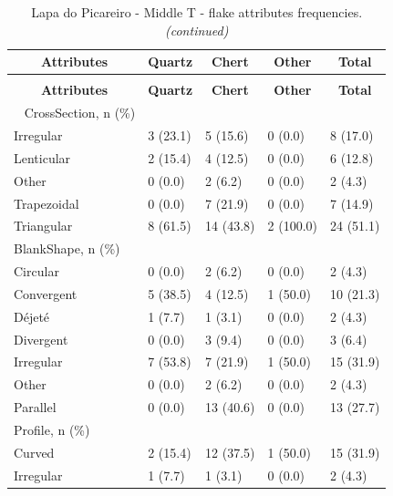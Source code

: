 \documentclass[12pt,twoside]{reedthesis}
\begin{document}
\newpage

\begingroup\fontsize{9}{11}\selectfont
\begin{longtable}[t]{lllll}
\caption{\label{tab:flakeattributesLP2}Lapa do Picareiro - Middle T - flake attributes frequencies.}\\
\toprule
\multicolumn{1}{c}{\textbf{Attributes}} & \multicolumn{1}{c}{\textbf{Quartz}} & \multicolumn{1}{c}{\textbf{Chert}} & \multicolumn{1}{c}{\textbf{Other}} & \multicolumn{1}{c}{\textbf{Total}}\\
\midrule
\endfirsthead
\caption[]{\label{tab:flakeattributesLP2}Lapa do Picareiro - Middle T - flake attributes frequencies. \textit{(continued)}}\\
\toprule
\multicolumn{1}{c}{\textbf{Attributes}} & \multicolumn{1}{c}{\textbf{Quartz}} & \multicolumn{1}{c}{\textbf{Chert}} & \multicolumn{1}{c}{\textbf{Other}} & \multicolumn{1}{c}{\textbf{Total}}\\
\midrule
\endhead
\
\endfoot
\bottomrule
\endlastfoot
CrossSection, n (\%) &  &  &  & \\
Irregular & 3 (23.1) & 5 (15.6) & 0 (0.0) & 8 (17.0)\\
Lenticular & 2 (15.4) & 4 (12.5) & 0 (0.0) & 6 (12.8)\\
Other & 0 (0.0) & 2 (6.2) & 0 (0.0) & 2 \vphantom{1} (4.3)\\
Trapezoidal & 0 (0.0) & 7 (21.9) & 0 (0.0) & 7 (14.9)\\
\addlinespace
Triangular & 8 (61.5) & 14 (43.8) & 2 (100.0) & 24 (51.1)\\
BlankShape, n (\%) &  &  &  & \\
Circular & 0 (0.0) & 2 (6.2) & 0 (0.0) & 2 (4.3)\\
Convergent & 5 (38.5) & 4 (12.5) & 1 (50.0) & 10 (21.3)\\
Déjeté & 1 (7.7) & 1 (3.1) & 0 (0.0) & 2 (4.3)\\
\addlinespace
Divergent & 0 (0.0) & 3 (9.4) & 0 (0.0) & 3 (6.4)\\
Irregular & 7 (53.8) & 7 (21.9) & 1 (50.0) & 15 (31.9)\\
Other & 0 (0.0) & 2 (6.2) & 0 (0.0) & 2 (4.3)\\
Parallel & 0 (0.0) & 13 (40.6) & 0 (0.0) & 13 (27.7)\\
Profile, n (\%) &  &  &  & \\
\addlinespace
Curved & 2 (15.4) & 12 (37.5) & 1 (50.0) & 15 (31.9)\\
Irregular & 1 (7.7) & 1 (3.1) & 0 (0.0) & 2 (4.3)\\

\end{longtable}
\end{document}
